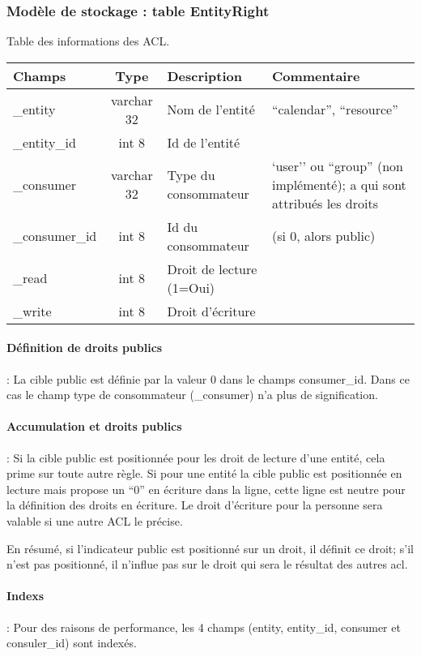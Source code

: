 \subsubsection{Modèle de stockage : table EntityRight}

Table des informations des ACL.\\

\begin{tabular}{|p{3cm}|c|p{4cm}|p{4cm}|}
\hline
\textbf{Champs} & \textbf{Type} & \textbf{Description} & \textbf{Commentaire} \\
\hline
\_entity & varchar 32 & Nom de l'entité & ``calendar'', ``resource'' \\
\hline
\_entity\_id & int 8 & Id de l'entité & \\
\hline
\_consumer & varchar 32 & Type du consommateur & `user'' ou ``group'' (non implémenté); a qui sont attribués les droits \\
\hline
\_consumer\_id & int 8 & Id du consommateur & (si 0, alors public)\\
\hline
\_read & int 8 & Droit de lecture (1=Oui) & \\
\hline
\_write & int 8 & Droit d'écriture & \\
\hline
\end{tabular}

\paragraph{Définition de droits publics} : La cible public est définie par la valeur 0 dans le champs consumer\_id. Dans ce cas le champ type de consommateur (\_consumer) n'a plus de signification.

\paragraph{Accumulation et droits publics} : Si la cible public est positionnée pour les droit de lecture d'une entité, cela prime sur toute autre règle.
Si pour une entité la cible public est positionnée en lecture mais propose un ``0'' en écriture dans la ligne, cette ligne est neutre pour la définition des droits en écriture. Le droit d'écriture pour la personne sera valable si une autre ACL le précise.

En résumé, si l'indicateur public est positionné sur un droit, il définit ce droit; s'il n'est pas positionné, il n'influe pas sur le droit qui sera le résultat des autres acl.

\paragraph{Indexs} : Pour des raisons de performance, les 4 champs (entity, entity\_id, consumer et consuler\_id) sont indexés.



